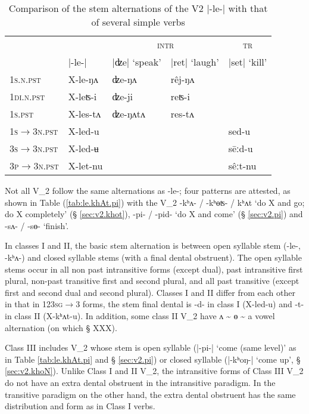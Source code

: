 \documentclass[oneside,a4paper,11pt]{article}
\newcommand{\ipa}[1]{{\phon#1}}
\newcommand{\dhatu}[2]{|\ipa{#1}| `#2'}
\newcommand{\grise}[1]{\cellcolor{lightgray}\textbf{#1}}
\newcommand{\tld}{\textasciitilde}
\begin{document}
\begin{table}[H] 
\caption{Comparison of the stem alternations of the V2 \ipa{|-le-|}  with that of several simple verbs} \label{tab:le.dze.ret} \centering 
\begin{tabular}{lllll} 
\toprule 
&& \multicolumn{2}{c}{\textsc{intr}} & \multicolumn{1}{c}{\textsc{tr}} \\ 
&\ipa{|-le-|}&\dhatu{ʣe}{speak} & \dhatu{ret}{laugh} & \dhatu{set}{kill}\\ 
\midrule
\textsc{1s.n.pst} &  \ipa{X-{le}-ŋʌ} & \ipa{ʣe-ŋʌ} & \ipa{rêj-ŋʌ} \grise{}&\grise{} \\ 
\textsc{1di.n.pst} &  \ipa{X-{leʦ}-i} & \ipa{ʣe-ji} \grise{}& \ipa{reʦ-i} &\grise{} \\ 
\textsc{1s.pst} & \ipa{X-{les}-tʌ} & \ipa{ʣe-ŋʌtʌ} \grise{}&  \ipa{res-tʌ} &\grise{} \\ 
\hline 
\textsc{1s$\rightarrow$3n.pst} &  \ipa{X-{led}-u} &\grise{} & \grise{} & \ipa{sed-u} \\ 
\textsc{3s$\rightarrow$3n.pst} &    \ipa{X-{led}-ʉ} &\grise{} & \grise{} & \ipa{sēːd-u} \\ 
\textsc{3p$\rightarrow$3n.pst} &    \ipa{X-{let}-nu} &\grise{} & \grise{} & \ipa{sêːt-nu} \\ 
\bottomrule 
\end{tabular}
\end{table}

Not all V_2 follow the same alternations as \ipa{-le-}; four patterns are attested, as shown in Table (\ref{tab:le.khAt.pi}) with the V_2 \ipa{-kʰʌ- / -kʰɵʦ- / kʰʌt} `do X and go; do X completely' (§ \ref{sec:v2.khot}), \ipa{-pi- / -pid-} `do X and come'  (§ \ref{sec:v2.pi}) and \ipa{-sʌ- / -sɵ-} `finish'.

In classes I and II, the basic stem alternation is between open syllable stem (\ipa{-le-}, \ipa{-kʰʌ-}) and closed syllable stems (with a final dental obstruent).  The open syllable stems occur in all non past intransitive forms (except dual), past intransitive first plural, non-past transitive first and second plural, and all past transitive (except first and second dual and second plural). Classes I and II differ from each other in that in 123\textsc{sg}$\rightarrow$3 forms, the stem final dental is \ipa{-d-} in class I (\ipa{X-led-u}) and \ipa{-t-} in class II (\ipa{X-kʰʌt-u}). In addition, some class II  V_2 have \ipa{ʌ \tld{} ɵ \tld{} a} vowel alternation (on which § XXX).

Class III includes V_2 whose stem is open syllable (\dhatu{-pi-}{come (same level)} as in Table \ref{tab:le.khAt.pi} and § \ref{sec:v2.pi}) or closed syllable (\dhatu{-kʰoŋ-}{come up}, § \ref{sec:v2.khoN}). Unlike Class I and II V_2, the intransitive forms of Class III V_2 do not have an extra dental obstruent in the intransitive paradigm. In the transitive paradigm on the other hand, the extra dental obstruent has the same distribution and form as in Class I verbs.
\end{document}
